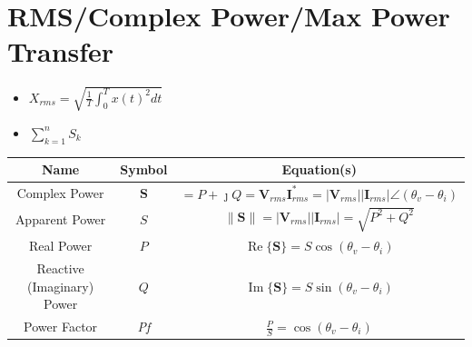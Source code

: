 \documentclass[10pt,letterpaper,final,twoside,notitlepage]{article}
\renewcommand{\Re}{\operatorname{Re}} %
\renewcommand{\Im}{\operatorname{Im}} %
\begin{document}
\section*{RMS/Complex Power/Max Power Transfer} \label{sec:Complex Power}
	\begin{itemize}[noitemsep]
		\item $X_{rms}=\sqrt{\frac{1}{T} \int_{0}^{T} x(t)^2 dt}$
		\item $\sum_{k=1}^{n} S_{k}$
	\end{itemize}
	\begin{table}[h!] %
		\centering
		\renewcommand{\arraystretch}{1.4}
		\begin{tabular}{|c|c|c|}
			\hline
			\textbf{Name} & \textbf{Symbol} & \textbf{Equation(s)} \\ \hline
			Complex Power & $\mathbf{S}$ & $=P+\jmath Q=\mathbf{V}_{rms} \mathbf{I}_{rms}^{*} = \lvert \mathbf{V}_{rms}\rvert \lvert \mathbf{I}_{rms}\rvert \angle \left( \theta_v - \theta_i\right) $ \\ \hline
			Apparent Power & $S$ & $\lVert \mathbf{S} \rVert = \lvert \mathbf{V}_{rms} \rvert \lvert \mathbf{I}_{rms} \rvert = \sqrt{P^2 + Q^2}$ \\ \hline
			Real Power & $P$ & $\Re\lbrace \mathbf{S} \rbrace = S \cos\left( \theta_v - \theta_i \right)$ \\ \hline
			Reactive (Imaginary) Power & $Q$ & $\Im\lbrace \mathbf{S} \rbrace = S \sin \left( \theta_v - \theta_i \right)$ \\ \hline
			Power Factor &\textit{Pf} & $\frac{P}{S} = \cos(\theta_v - \theta_i)$ \\ \hline
		\end{tabular}
	\end{table}
\end{document}

